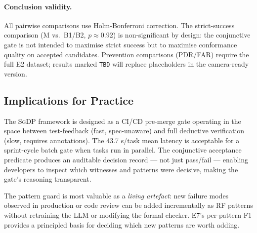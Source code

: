 \paragraph{Conclusion validity.}
All pairwise comparisons use Holm-Bonferroni correction.
The strict-success comparison (M vs.\ B1/B2, $p \approx 0.92$) is non-significant
by design: the conjunctive gate is not intended to maximise strict success but to
maximise conformance quality on accepted candidates.
Prevention comparisons (PDR/FAR) require the full E2 dataset; results marked
\texttt{TBD} will replace placeholders in the camera-ready version.

\subsection{Implications for Practice}

The \textsc{SgDP} framework is designed as a CI/CD pre-merge gate operating in the space
between test-feedback (fast, spec-unaware) and full deductive verification (slow, requires
annotations).  The 43.7 s/task mean latency is acceptable for a sprint-cycle batch gate
when tasks run in parallel.  The conjunctive acceptance predicate produces an auditable
decision record — not just pass/fail — enabling developers to inspect which witnesses
and patterns were decisive, making the gate's reasoning transparent.

The pattern guard is most valuable as a \emph{living artefact}: new failure modes
observed in production or code review can be added incrementally as RF patterns without
retraining the LLM or modifying the formal checker.  E7's per-pattern F1 provides a
principled basis for deciding which new patterns are worth adding.
